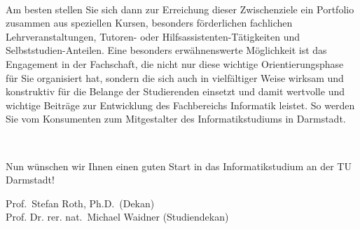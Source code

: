{    \

    Am besten stellen Sie sich dann zur Erreichung dieser Zwischenziele ein Portfolio zusammen aus speziellen Kursen, besonders förderlichen fachlichen Lehrveranstaltungen, Tutoren- oder Hilfsassistenten-Tätigkeiten und Selbststudien-Anteilen. Eine besonders erwähnenswerte Möglichkeit ist das Engagement in der Fachschaft, die nicht nur diese wichtige Orientierungsphase für Sie organisiert hat, sondern die sich auch in vielfältiger Weise wirksam und konstruktiv für die Belange der Studierenden einsetzt und damit wertvolle und wichtige Beiträge zur Entwicklung des Fachbereichs Informatik leistet. So werden Sie vom Konsumenten zum Mitgestalter des Informatikstudiums in Darmstadt.

    \

    Nun wünschen wir Ihnen einen guten Start in das Informatikstudium an der TU Darmstadt!
}
{Prof.~Stefan Roth, Ph.D.~(Dekan) \\Prof. Dr. rer. nat.~Michael Waidner (Studiendekan)}

\newpage

